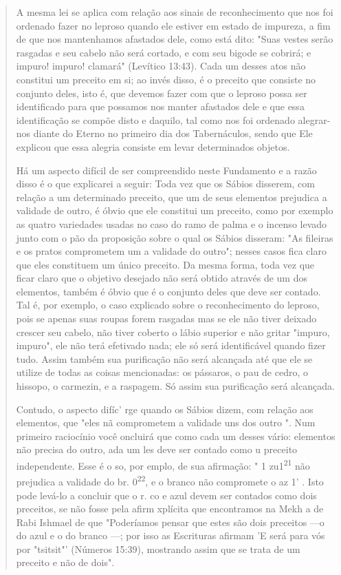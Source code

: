\begin{quote}
A mesma lei se aplica com relação aos sinais de reconhecimento que nos
foi ordenado fazer no leproso quando ele estiver em estado de impureza,
a fim de que nos mantenhamos afastados dele, como está dito: "Suas
vestes serão rasgadas e seu cabelo não será cortado, e com seu bigode se
cobrirá; e impuro! impuro! clamará" (Levítico 13:43). Cada um desses
atos não constitui um preceito em si; ao invés disso, é o preceito que
consiste no conjunto deles, isto é, que devemos 
fazer com que o leproso possa ser identificado para
que possamos nos manter afastados dele e que essa identificação se
compõe disto e daquilo, tal como nos foi ordenado alegrar-nos diante do
Eterno no primeiro dia dos Tabernáculos, sendo que Ele explicou que essa
alegria consiste em le­var determinados objetos.

Há um aspecto difícil de ser compreendido neste Fundamento e a razão
disso é o que explicarei a seguir: Toda vez que os Sábios disserem, com
relação a um determinado preceito, que um de seus elementos prejudica a
vali­dade de outro, é óbvio que ele constitui um preceito, como por
exemplo as quatro variedades usadas no caso do ramo de palma e o incenso
levado junto com o pão da proposição sobre o qual os Sábios disseram:
"As fileiras e os pra­tos comprometem um a validade do outro"; nesses
casos fica claro que eles constituem um único preceito. Da mesma forma,
toda vez que ficar claro que o objetivo desejado não será obtido através
de um dos elementos, também é óbvio que é o conjunto deles que deve ser
contado. Tal é, por exemplo, o caso explicado sobre o reconhecimento do
leproso, pois se apenas suas roupas fo­rem rasgadas mas se ele não tiver
deixado crescer seu cabelo, não tiver coberto o lábio superior e não
gritar "impuro, impuro", ele não terá efetivado nada; ele só será
identificável quando fizer tudo. Assim também sua purificação não será
alcançada até que ele se utilize de todas as coisas mencionadas: os
pássa­ros, o pau de cedro, o hissopo, o carmezin, e a raspagem. Só assim
sua purifica­ção será alcançada.

Contudo, o aspecto difíc' rge quando os Sábios dizem, com rela­ção aos
elementos, que "eles nã comprometem a validade uns dos outro ". Num
primeiro raciocínio você oncluirá que como cada um desses vário:
ele­mentos não precisa do outro, ada um les deve ser contado como u
pre­ceito independente. Esse é o so, por emplo, de sua afirmação: " 1
zu1\textsuperscript{21} não prejudica a validade do br.
0\textsuperscript{22}, e o branco não compromete o az 1' . Isto pode
levá-lo a concluir que o r. co e azul devem ser contados como dois
preceitos, se não fosse pela afirm xplícita que encontramos na Mekh a de
Rabi Ishmael de que "Poderíamos pensar que estes são dois preceitos ---o
do azul e o do branco ---; por isso as Escrituras afirmam 'E será para
vós por "tsitsit"' (Números 15:39), mostrando assim que se trata de um
preceito e não de dois".


\end{quote}
